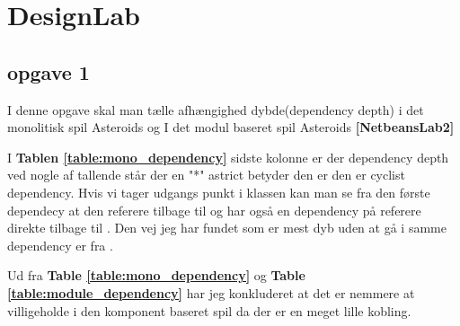\section{DesignLab}


\subsection{opgave 1}%
\label{sub:opgave_1}
I denne opgave skal man tælle afhængighed dybde(dependency depth) i det
monolitisk spil Asteroids og I det modul baseret spil Asteroids
\textbf{[NetbeansLab2]} 


I \textbf{Tablen \ref{table:mono_dependency}} sidste kolonne er der dependency
depth ved nogle af tallende står der en "*" astrict betyder den er den er
cyclist dependency. Hvis vi tager udgangs punkt i klassen  kan
man se fra den første dependecy  at den referere tilbage
til  og  har også en dependency på
 referere direkte tilbage til .  Den vej
jeg har fundet som er mest dyb uden at gå i samme dependency er
 fra .

Ud fra \textbf{Table \ref{table:mono_dependency}} og \textbf{Table
\ref{table:module_dependency}} har jeg konkluderet at det er nemmere at
villigeholde i den komponent baseret spil da der er en meget lille kobling.

